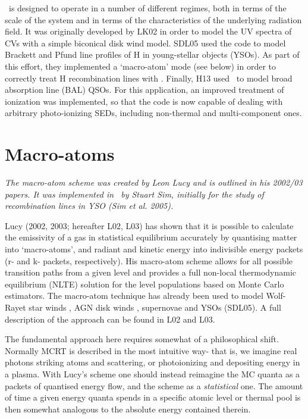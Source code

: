\py\ is designed to operate in a number of different
regimes, both in terms of the scale of the system and in terms of the
characteristics of the underlying radiation field.
It was originally developed by LK02 in order to model the UV spectra
of CVs with a simple biconical disk wind model. SDL05
\nocite{simmacro2005} used the code to model Brackett
and Pfund line profiles of H in young-stellar objects (YSOs). As part
of this effort, they implemented a `macro-atom' mode (see below) in
order to correctly treat H recombination lines with
\py. Finally, H13 used \py\ to model broad absorption line (BAL) QSOs. For
this application, an improved treatment of ionization was implemented,
so that the code is now capable of dealing with arbitrary
photo-ionizing SEDs, including non-thermal and multi-component ones. 



\section{Macro-atoms}

{\sl The macro-atom scheme was created by Leon Lucy and is outlined in 
his 2002/03 papers. It was implemented in \py\ by Stuart Sim, initially
for the study of recombination lines in YSO (Sim et al. 2005).}

Lucy (2002, 2003\nocite{lucy2002, lucy2003}; hereafter L02, L03) 
has shown that it is possible to calculate the emissivity of a gas in
statistical equilibrium accurately by quantising matter into
`macro-atoms', and radiant and kinetic energy into indivisible energy
packets (r- and k- packets, respectively). His macro-atom scheme
allows for all possible transition paths from a given level and
provides a full non-local thermodynamic equilibrium (NLTE) solution
for the level populations based on Monte Carlo estimators. The macro-atom
technique has already been used to model Wolf-Rayet star
winds \citep{sim2004}, AGN disk winds \citep{simlong2008, tatum2012},
supernovae \citep{kromersim2009, kerzendorfsim} and YSOs (SDL05). A full 
description of the approach can be found in L02 and L03. 

The fundamental approach here requires somewhat of a philosophical shift.
Normally MCRT is described in the most intuitive way- that is, we imagine
real photons striking atoms and scattering, or photoionizing 
and depositing energy in a plasma. With Lucy's scheme one should instead 
reimagine the MC quanta as a packets of quantised energy flow, and the scheme as a 
{\em statistical} one. The amount of time a given energy quanta spends in a specific atomic
level or thermal pool is then somewhat analogous to the absolute energy 
contained therein.

